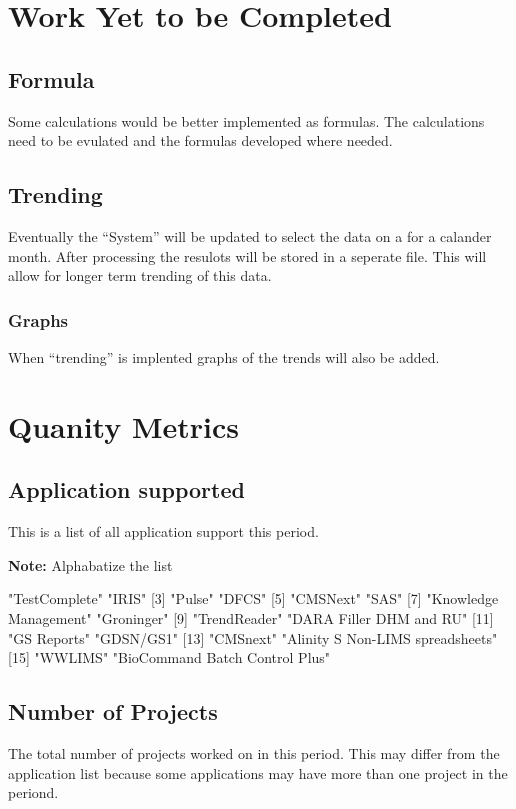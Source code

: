 \documentclass{article}
\begin{document}
\section{Work Yet to be Completed}
\subsection{Formula}
Some calculations would be better implemented as formulas. The calculations need
to be evulated and the formulas developed where needed.
\subsection{Trending}
Eventually the ``System'' will be updated to select the data on a for a calander
month. After processing the resulots will be stored in a seperate file.
This will allow for longer term trending of this data.
\subsubsection{Graphs}
When ``trending'' is implented graphs of the trends will also be added.


\section{Quanity Metrics}
\subsection{Application supported}
This is a list of all application support this period.

\textbf{Note:} Alphabatize the list

\begin{Schunk}
\begin{Soutput}
 [1] "TestComplete"                    "IRIS"                           
 [3] "Pulse"                           "DFCS"                           
 [5] "CMSNext"                         "SAS"                            
 [7] "Knowledge Management"            "Groninger"                      
 [9] "TrendReader"                     "DARA Filler DHM and RU"         
[11] "GS Reports"                      "GDSN/GS1"                       
[13] "CMSnext"                         "Alinity S Non-LIMS spreadsheets"
[15] "WWLIMS"                          "BioCommand Batch Control Plus"  
\end{Soutput}
\end{Schunk}

\subsection{Number of Projects}
The total number of  projects worked on in this period. This may differ from the
application list because some applications may have more than one project in
the periond.
\end{document}
